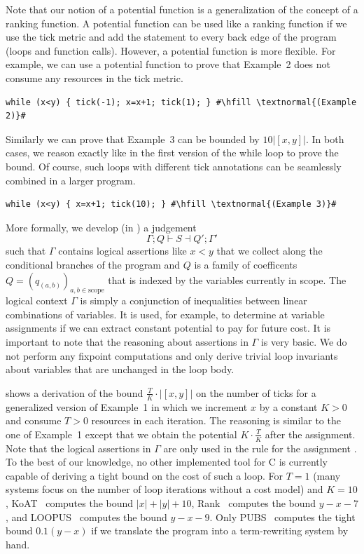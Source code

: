 \documentclass[nocopyrightspace,preprint]{sigplanconf}
\newcommand{\pref}[1]{\prettyref{#1}}
\begin{document}
Note that our notion of a potential function is a generalization of the
concept of a ranking function.  A potential function can be used like
a ranking function if we use the tick metric and add the statement
 to every back edge of the program (loops and function
calls).  However, a potential function is more flexible.  For example,
we can use a potential function to prove that Example~2 does not
consume any resources in the tick metric.
\begin{lstlisting}[basicstyle=\tt\small]
  while (x<y) { tick(-1); x=x+1; tick(1); } #\hfill \textnormal{(Example 2)}#
\end{lstlisting}
Similarly we can prove that Example~3 can be bounded by $10|[x,y]|$.
In both cases, we reason exactly like in the first version of the
while loop to prove the bound.  Of course, such loops with different
tick annotations can be seamlessly combined in a larger program.
\begin{lstlisting}[basicstyle=\tt\small]
  while (x<y) { x=x+1; tick(10); } #\hfill \textnormal{(Example 3)}#
\end{lstlisting}
%
More formally, we develop (in \pref{sec:AAA}) a judgement
$$
\Gamma; Q \vdash S \dashv Q'; \Gamma'
$$
such that $\Gamma$ contains logical assertions like $x<y$ that we
collect along the conditional branches of the program and $Q$ is a
family of coefficents $Q = (q_{(a,b)})_{a,b \in \text{scope}}$ that is
indexed by the variables currently in scope.  The logical
context $\Gamma$ is simply a conjunction of inequalities between
linear combinations of variables.  It is used, for example, to determine
at variable assignments if we can extract constant potential to pay for future
cost.  It is important to note that the reasoning about assertions in
$\Gamma$ is very basic.  We do not perform any fixpoint computations
and only derive trivial loop invariants about variables that are
unchanged in the loop body.

\pref{fig:ex1} shows a derivation of the bound
$\frac{T}{K}{\cdot}|[x,y]|$ on the number of ticks for a generalized
version of Example~1 in which we increment $x$ by a constant $K>0$ and
consume $T>0$ resources in each iteration.  The reasoning is similar
to the one of Example~1 except that we obtain the potential
$K{\cdot}\frac{T}{K}$ after the assignment.  Note that the logical
assertions in $\Gamma$ are only used in the rule for the assignment
.  To the best of our knowledge, no other implemented tool
for C is currently capable of deriving a tight bound on the cost of
such a loop.  For $T=1$ (many systems focus on the number of loop
iterations without a cost model) and $K=10$,
KoAT~\cite{BrockschmidtEFFG14} computes the bound $|x| + |y| + 10$,
Rank~\cite{AliasDFG10} computes the bound $y-x-7$, and
LOOPUS~\cite{SinnZV14} computes the bound $y-x-9$.  Only
PUBS~\cite{AlbertAGPZ12} computes the tight bound $0.1(y-x)$ if we
translate the program into a term-rewriting system by hand.
\end{document}

